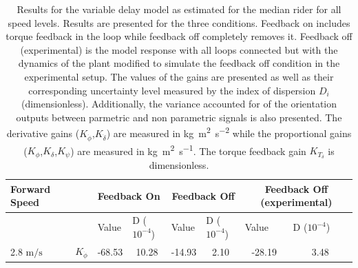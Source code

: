 \begin{table}[]
    \caption{ Results for the variable delay model as estimated for the median rider for all speed levels. Results are presented for the three conditions. Feedback on includes torque feedback in the loop while feedback off completely removes it. Feedback off (experimental) is the model response with all loops connected but with the dynamics of the plant modified to simulate the feedback off condition in the experimental setup. The values of the gains are presented as well as their corresponding uncertainty level measured by the index of dispersion \ensuremath{D_i} (dimensionless). Additionally, the variance accounted for of the orientation outputs between parmetric and non parametric signals is also presented. The derivative gains (\ensuremath{K_{\dot{\phi}}},\ensuremath{K_{\dot{\delta}}}) are measured in \si{\kilogram\square\meter\per\square\second} while the proportional gains (\ensuremath{K_{\phi}},\ensuremath{K_{\delta}},\ensuremath{K_{\psi}}) are measured in \si{\kilogram\square\meter\per\second}. The torque feedback gain \ensuremath{K_{T_\delta}} is dimensionless.}
    \begin{tabular}{llcccccc}
    \hline
    Forward Speed                &                       & \multicolumn{2}{l}{Feedback On}                                                                 & \multicolumn{2}{c}{Feedback Off}                                                                & \multicolumn{2}{c}{Feedback Off (experimental)}                                                 \\ \hline
                                 &                       & \multicolumn{1}{l}{\multirow{2}{*}{Value}} & \multicolumn{1}{l}{\multirow{2}{*}{D ($10^{-4}$)}} & \multicolumn{1}{l}{\multirow{2}{*}{Value}} & \multicolumn{1}{l}{\multirow{2}{*}{D ($10^{-4}$)}} & \multicolumn{1}{l}{\multirow{2}{*}{Value}} & \multicolumn{1}{l}{\multirow{2}{*}{D ($10^{-4}$)}} \\
                                 &                       & \multicolumn{1}{l}{}                       & \multicolumn{1}{l}{}                               & \multicolumn{1}{l}{}                       & \multicolumn{1}{l}{}                               & \multicolumn{1}{l}{}                       & \multicolumn{1}{l}{}                               \\ \cline{3-8} 
    2.8 $\si{\meter\per\second}$ & $K_{\dot{\phi}} $     & -68.53                                     & 10.28                                              & -14.93                                     & 2.10                                               & -28.19                                     & 3.48                                               \\

\end{tabular}
\end{table}
